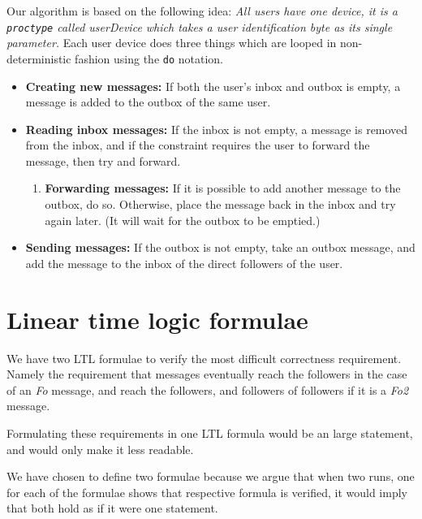 \documentclass[10pt,a4paper]{article}
\begin{document}
	Our algorithm is based on the following idea:
	\textit{All users have one device, it is a \texttt{proctype} called userDevice which takes a user identification byte as its single parameter.}
	Each user device does three things which are looped in non-deterministic fashion using the \texttt{do} notation.
	\begin{itemize}
		\item \textbf{Creating new messages:} If both the user's inbox and outbox is empty, a message is added to the outbox of the same user.
		\item \textbf{Reading inbox messages:} If the inbox is not empty, a message is removed from the inbox, and if the constraint requires the user to forward the message, then try and forward.
		\begin{enumerate}
			\item \textbf{Forwarding messages:} If it is possible to add another message to the outbox, do so. Otherwise, place the message back in the inbox and try again later. (It will wait for the outbox to be emptied.)
		\end{enumerate}
		\item \textbf{Sending messages:} If the outbox is not empty, take an outbox message, and add the message to the inbox of the direct followers of the user.
	\end{itemize}
	
	\section{Linear time logic formulae}
	We have two LTL formulae to verify the most difficult correctness requirement.
	Namely the requirement that messages eventually reach the followers in the case of an \textit{Fo} message, and reach the followers, and followers of followers if it is a \textit{Fo2} message.
	
	Formulating these requirements in one LTL formula would be an large statement, and would only make it less readable.
	
	We have chosen to define two formulae because we argue that when two runs, one for each of the formulae shows that respective formula is verified, it would imply that both hold as if it were one statement.
	
\end{document}
